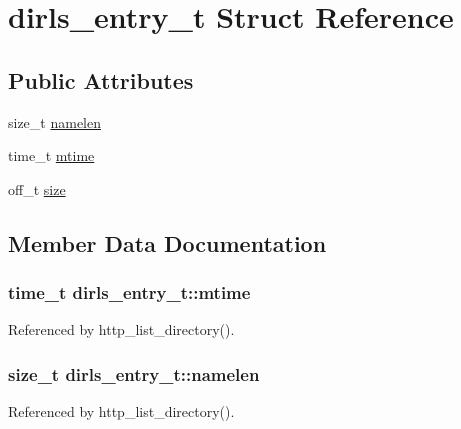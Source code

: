 \hypertarget{structdirls__entry__t}{\section{dirls\-\_\-entry\-\_\-t Struct Reference}
\label{structdirls__entry__t}
}
\subsection*{Public Attributes}
\begin{DoxyCompactItemize}
\item 
size\-\_\-t \hyperlink{structdirls__entry__t_ad398f9288f9c86ce7f68620f1b92a5c4}{namelen}
\item 
time\-\_\-t \hyperlink{structdirls__entry__t_abea6376eb80a3ba69a29f46e8052ebb2}{mtime}
\item 
off\-\_\-t \hyperlink{structdirls__entry__t_a4517c7829084ec4db378929f428b084a}{size}
\end{DoxyCompactItemize}


\subsection{Member Data Documentation}
\hypertarget{structdirls__entry__t_abea6376eb80a3ba69a29f46e8052ebb2}{
\subsubsection[{mtime}]{\setlength{\rightskip}{0pt plus 5cm}time\-\_\-t dirls\-\_\-entry\-\_\-t\-::mtime}}\label{structdirls__entry__t_abea6376eb80a3ba69a29f46e8052ebb2}


Referenced by http\-\_\-list\-\_\-directory().

\hypertarget{structdirls__entry__t_ad398f9288f9c86ce7f68620f1b92a5c4}{
\subsubsection[{namelen}]{\setlength{\rightskip}{0pt plus 5cm}size\-\_\-t dirls\-\_\-entry\-\_\-t\-::namelen}}\label{structdirls__entry__t_ad398f9288f9c86ce7f68620f1b92a5c4}


Referenced by http\-\_\-list\-\_\-directory().

